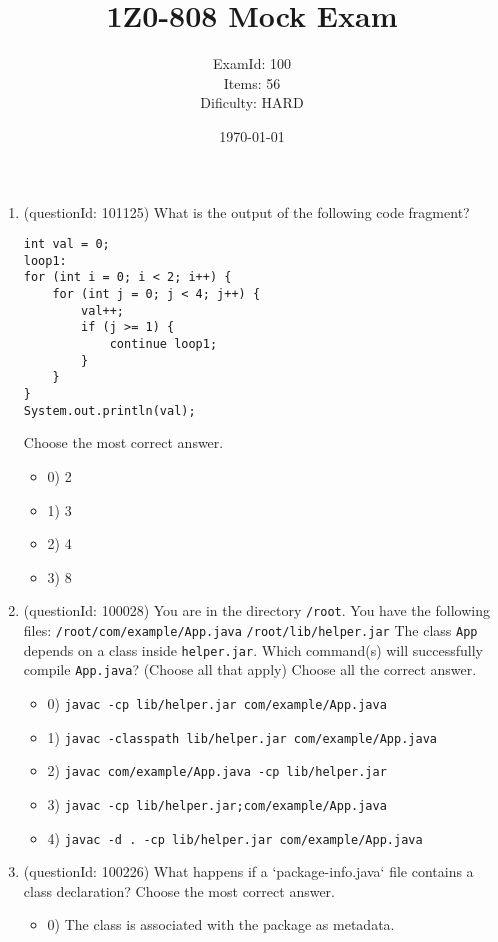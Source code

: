 \documentclass[12pt]{article}
\title{\textbf{1Z0-808 Mock Exam}}
\author{ExamId: 100 \\ Items: 56 \\ Dificulty: HARD}
\date{\today}
\begin{document}
\maketitle
\newpage\begin{enumerate}[label=(\arabic*)]
\item (questionId: 101125) What is the output of the following code fragment?\n\begin{verbatim}
int val = 0;
loop1:
for (int i = 0; i < 2; i++) {
    for (int j = 0; j < 4; j++) {
        val++;
        if (j >= 1) {
            continue loop1;
        }
    }
}
System.out.println(val);
\end{verbatim}
Choose the most correct answer. 
\begin{itemize}
\item 0) 2

\item 1) 3

\item 2) 4

\item 3) 8

\end{itemize}
\item (questionId: 100028) You are in the directory \verb|/root|. You have the following files:
\verb|/root/com/example/App.java|
\verb|/root/lib/helper.jar|
The class \verb|App| depends on a class inside \verb|helper.jar|. Which command(s) will successfully compile \verb|App.java|? (Choose all that apply)
Choose all the correct answer.\begin{itemize}
\item 0) \verb|javac -cp lib/helper.jar com/example/App.java|

\item 1) \verb|javac -classpath lib/helper.jar com/example/App.java|

\item 2) \verb|javac com/example/App.java -cp lib/helper.jar|

\item 3) \verb|javac -cp lib/helper.jar;com/example/App.java|

\item 4) \verb|javac -d . -cp lib/helper.jar com/example/App.java|

\end{itemize}
\item (questionId: 100226) What happens if a `package-info.java` file contains a class declaration?
Choose the most correct answer. 
\begin{itemize}
\item 0) The class is associated with the package as metadata.


\end{itemize}
\end{enumerate}
\end{document}
